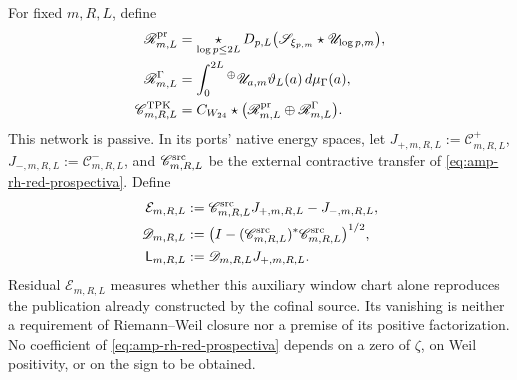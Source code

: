 \begin{theorem}
\label{thm:amp-rh-acoplamiento-prospectivo}
For fixed \(m,R,L\), define
\begin{align}
 \mathscr R^{\rm pr}_{m,L}
 &=
 \mathop{\star}_{\log p\leq2L}
 D_{p,L}\bigl(\mathscr S_{\xi_{p,m}}\star
              \mathscr U_{\log p,m}\bigr),\nonumber\\
 \mathscr R^\Gamma_{m,L}
 &=
 \int_0^{2L}{}^\oplus
 \mathscr U_{a,m}
 \vartheta_L(a)\,d\mu_\Gamma(a),\nonumber\\
 \mathscr C^{\rm TPK}_{m,R,L}
 &=C_{W_{24}}\star
 \bigl(\mathscr R^{\rm pr}_{m,L}
       \oplus\mathscr R^\Gamma_{m,L}\bigr).
 \label{eq:amp-rh-red-prospectiva}
\end{align}
This network is passive. In its ports' native energy spaces, let \(J_{+,m,R,L}:=\mathcal C^+_{m,R,L}\), \(J_{-,m,R,L}:=\mathcal C^-_{m,R,L}\), and \(\mathscr C^{\rm src}_{m,R,L}\) be the external contractive transfer of \eqref{eq:amp-rh-red-prospectiva}. Define
\begin{equation}\label{eq:amp-rh-publicaciones-construidas}
 \begin{aligned}
 \mathcal E_{m,R,L}
 &:=\mathscr C^{\rm src}_{m,R,L}J_{+,m,R,L}
    -J_{-,m,R,L},\\
 \mathscr D_{m,R,L}
 &:=\bigl(I-(\mathscr C^{\rm src}_{m,R,L})^*
                  \mathscr C^{\rm src}_{m,R,L}\bigr)^{1/2},\\
 \mathsf L_{m,R,L}&:=\mathscr D_{m,R,L}J_{+,m,R,L}.
 \end{aligned}
\end{equation}
Residual \(\mathcal E_{m,R,L}\) measures whether this auxiliary window chart alone reproduces the publication already constructed by the cofinal source. Its vanishing is neither a requirement of Riemann--Weil closure nor a premise of its positive factorization. No coefficient of \eqref{eq:amp-rh-red-prospectiva} depends on a zero of \(\zeta\), on Weil positivity, or on the sign to be obtained.
\end{theorem}

